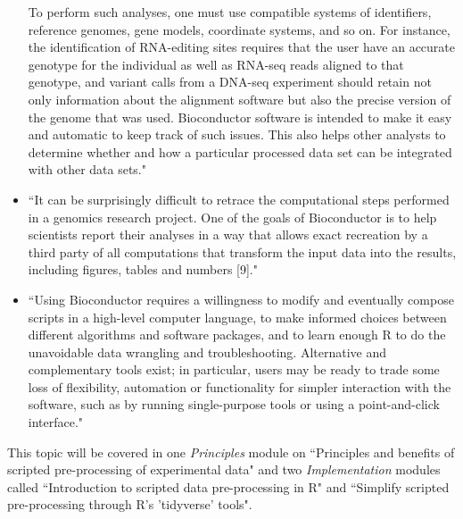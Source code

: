 \documentclass[pdftex,english,11pt,parskip=half]{scrartcl}
\begin{document}
\begin{itemize}
To perform such analyses, one must use compatible systems of identifiers, reference genomes, gene models, coordinate systems, and so on. For instance, the identification of RNA-editing sites requires that the user have an accurate genotype for the individual as well as RNA-seq reads aligned to that genotype, and variant calls from a DNA-seq experiment should retain not only information about the alignment software but also the precise version of the genome that was used. Bioconductor software is intended to make it easy and automatic to keep track of such issues. This also helps other analysts to determine whether and how a particular processed data set can be integrated with other data sets." \cite{huber2015orchestrating}
\item ``It can be surprisingly difficult to retrace the computational steps performed in a genomics research project. One of the goals of Bioconductor is to help scientists report their analyses in a way that allows exact recreation by a third party of all computations that transform the input data into the results, including figures, tables and numbers [9]." \cite{huber2015orchestrating}
\item ``Using Bioconductor requires a willingness to modify and eventually compose scripts in a high-level computer language, to make informed choices between different algorithms and software packages, and to learn enough R to do the unavoidable data wrangling and troubleshooting. Alternative and complementary tools exist; in particular, users may be ready to trade some loss of flexibility, automation or functionality for simpler interaction with the software, such as by running single-purpose tools or using a point-and-click interface." \cite{huber2015orchestrating}
\end{itemize}

This topic will be covered in one
\textit{Principles} module on ``Principles and benefits of scripted
pre-processing of experimental data" and two \textit{Implementation} modules
called ``Introduction to scripted data pre-processing in R" and ``Simplify
scripted pre-processing through R's 'tidyverse' tools".
\end{document}
